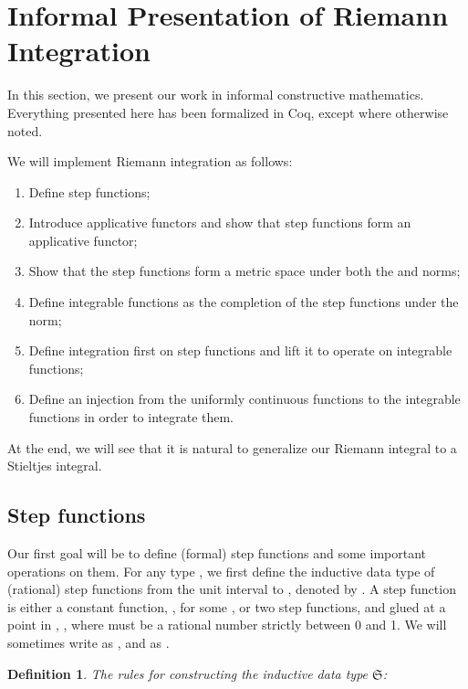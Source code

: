 \documentclass{elsarticle}
\newtheorem{definition}{Definition}
\newcommand{\SF}{\ensuremath{\mathfrak{S}}}
\begin{document}
\section{Informal Presentation of Riemann Integration}

In this section, we present our work in informal constructive mathematics.
Everything presented here has been formalized in Coq, except where otherwise
noted.

We will implement Riemann integration as follows:
\begin{enumerate}
  \item Define step functions;
  
  \item Introduce applicative functors and show that step functions form an
  applicative functor;
  
  \item Show that the step functions form a metric space under both the 
  and  norms;
  
  \item Define integrable functions as the completion of the step functions
  under the  norm;
  
  \item Define integration first on step functions and lift it to operate on
  integrable functions;
  
  \item Define an injection from the uniformly continuous functions to the
  integrable functions in order to integrate them.
\end{enumerate}
At the end, we will see that it is natural to generalize our Riemann integral
to a Stieltjes integral.

\subsection{Step functions}\label{ss:Step}\label{ss:InductiveDef}Our first
goal will be to define (formal) step functions and some important
operations on them. For any type , we first define the
inductive data type of (rational) step functions from the unit interval to
, denoted by . A step function is either a constant function,
, for some , or two
step functions,  and  glued at a point in ,
, where  must be a
rational number strictly between 0 and 1. We will sometimes write  as
, and  as .

\begin{definition}
  The rules for constructing the inductive data type {\SF}:
          
\end{definition}
\end{document}
